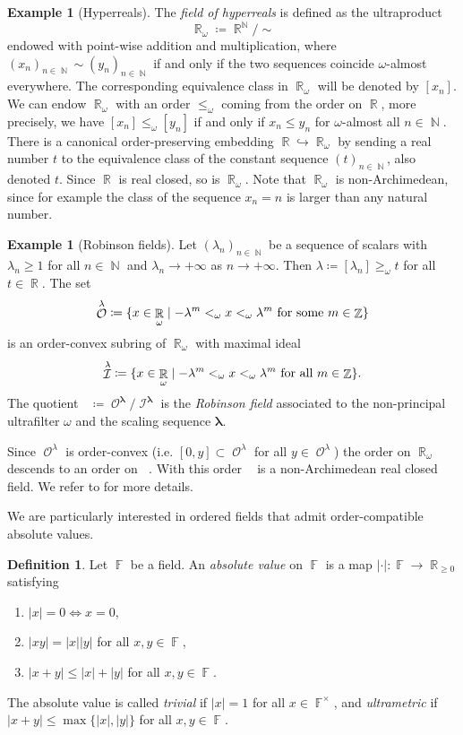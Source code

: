 \documentclass{amsart}
\theoremstyle{plain}
\theoremstyle{definition}
\newtheorem{example}[proposition]{Example}
\newtheorem{definition}[proposition]{Definition}
\DeclareMathOperator{\N}{{\mathbb{N}}}
\DeclareMathOperator{\Ic}{\mathcal{I}}
\DeclareMathOperator{\Oc}{\mathcal{O}}
\DeclareMathOperator{\Fb}{{\mathbb{F}}}
\DeclareMathOperator{\Nb}{{\mathbb{N}}}
\DeclareMathOperator{\Rb}{{\mathbb{R}}}
\DeclareMathOperator{\Zb}{\mathbb{Z}}
\DeclareMathOperator{\Rbom}{\mathbb{R}^\lambda_\omega}
\newcommand{\abs}[1]{\left|#1\right|}
\newcommand*\from{\colon}
\newcommand{\1}{\mathbf{1}}
\begin{document}
\begin{example}[Hyperreals]
    The \emph{field of hyperreals} is defined as the ultraproduct \[\Rb_\omega\coloneqq \Rb^{\Nb}/\sim\] endowed with point-wise addition and multiplication, where $(x_n)_{n \in \Nb} \sim (y_n)_{n\in \Nb}$ if and only if the two sequences coincide $\omega$-almost everywhere. The corresponding equivalence class in $\Rb_\omega$ will be denoted by $[x_n]$. We can endow $\Rb_\omega$ with an order $\leq_\omega$ coming from the order on $\Rb$, more precisely, we have $[x_n]\leq_\omega [y_n]$ if and only if $x_n \leq y_n$ for $\omega$-almost all $n \in \Nb$. There is a canonical order-preserving embedding $\Rb \hookrightarrow \Rb_\omega$ by sending a real number $t$ to the equivalence class of the constant sequence $(t)_{n\in \N}$, also denoted $t$. Since $\Rb$ is real closed, so is $\Rb_\omega$. Note that $\Rb_\omega$ is non-Archimedean, since for example the class of the sequence $x_n = n$ is larger than any natural number.
\end{example}

\begin{example}[Robinson fields]
\label{example:RobinsonField}
Let $(\lambda_n)_{n \in \Nb}$ be a sequence of scalars with $\lambda_n \geq 1$ for all $n\in \Nb$ and $\lambda_n \to +\infty$ as $n \to +\infty$.
Then $\lambda \coloneqq [\lambda_n ] \geq_\omega t$ for all $t \in \Rb$.
The set
\[\Oc^\mathbf{\lambda} \coloneqq \{ x \in \Rb_\omega \mid -\lambda^m <_\omega x <_\omega \lambda^m  \textnormal{ for some } m \in \Zb\} \]
is an order-convex subring of $\Rb_\omega$ with maximal ideal
\[\Ic^\mathbf{\lambda} \coloneqq \{ x \in \Rb_\omega \mid -\lambda^m <_\omega x <_\omega \lambda^m \textnormal{ for all } m \in \Zb\}. \]
The quotient $\Rbom \coloneqq \Oc^\mathbf{\lambda}/\Ic^\mathbf{\lambda}$ is the \emph{Robinson field} associated to the non-principal ultrafilter $\omega$ and the scaling sequence $\mathbf{\lambda}$.

Since $\Oc^\lambda$ is order-convex (i.e. $[0,y]\subset \Oc^\lambda$ for all $y\in \Oc^\lambda$) the order on $\Rb_\omega$ descends to an order on $\Rbom$.
With this order $\Rbom$ is a non-Archimedean real closed field.
We refer to \cite[\S 2.1]{BurgerIozziParreauPozzetti_RSCCharacterVarieties2} for more details.
\end{example}


We are particularly interested in ordered fields that admit order-compatible absolute values.

\begin{definition}
Let $\Fb$ be a field. 
An \emph{absolute value} on $\Fb$ is a map $\abs{\cdot} \from \Fb \to \Rb_{\geq 0}$ satisfying
\begin{enumerate}
\item $\abs{x} = 0 \iff x =0$,
\item $\abs{xy}=\abs{x}\abs{y}$ for all $x,y \in \Fb$,
\item $\abs{x+y} \leq \abs{x} + \abs{y}$ for all $x,y \in \Fb$.
\end{enumerate}
The absolute value is called \emph{trivial} if $\abs{x}=1$ for all $x \in \Fb^\times$, and \emph{ultrametric} if $\abs{x+y} \leq \max\{\abs{x},\abs{y}\}$ for all $x,y \in \Fb$.
\end{definition}
\end{document}
